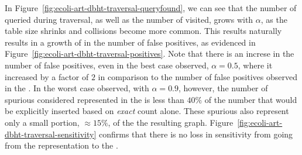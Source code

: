 In Figure~\ref{fig:ecoli-art-dbht-traversal-queryfound}, we can see that the number of  queried during traversal, as well as the number of  visited, grows with $\alpha$, as the table size shrinks and collisions become more common. This results naturally results in a growth of in the number of false positives, as evidenced in Figure~\ref{fig:ecoli-art-dbht-traversal-positives}. Note that there is an increse in the number of false positives, even in the best case observed, $\alpha = 0.5$, where it increased by a factor of $2$ in comparison to the number of false positives observed in the \dBCM. In the worst case observed, with $\alpha = 0.9$, however, the number of spurious  considered represented in the \dBG is less than $40\%$ of the number that would be explicitly inserted based on \emph{exact} count alone. These spurious  also represent only a small portion, $\approx 15\%$, of the the resulting graph. Figure~\ref{fig:ecoli-art-dbht-traversal-sensitivity} confirms that there is no loss in sensitivity from going from the \dBCM representation to the \dBHT.

